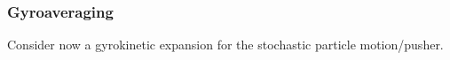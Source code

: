 \subsubsection{Gyroaveraging}\label{cha:gyroaveraging}
    Consider now a gyrokinetic expansion for the stochastic particle motion/pusher.


    
    
    
